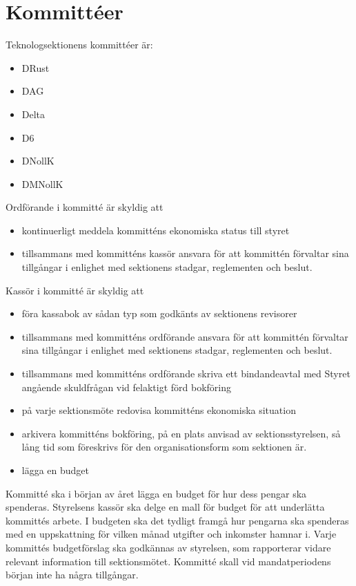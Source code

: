 \documentclass[a4paper]{dteklag}
\begin{document}
\section{Kommittéer}
\para Teknologsektionens kommittéer är:
\begin{itemize}
  \item DRust
  \item DAG
  \item Delta
  \item D6
  \item DNollK
  \item DMNollK
\end{itemize}
\para Ordförande i kommitté är skyldig att
\begin{itemize}
  \item kontinuerligt meddela kommitténs ekonomiska status till styret
  \item tillsammans med kommitténs kassör ansvara för att kommittén förvaltar sina tillgångar i enlighet med sektionens stadgar, reglementen och beslut.
\end{itemize}
\para Kassör i kommitté är skyldig att
\begin{itemize}
  \item föra kassabok av sådan typ som godkänts av sektionens revisorer
  \item tillsammans med kommitténs ordförande ansvara för att kommittén förvaltar sina tillgångar i enlighet med sektionens stadgar, reglementen och beslut.
  \item tillsammans med kommitténs ordförande skriva ett bindandeavtal med Styret angående skuldfrågan vid felaktigt förd bokföring
  \item på varje sektionsmöte redovisa kommitténs ekonomiska situation
  \item arkivera kommitténs bokföring, på en plats anvisad av sektionsstyrelsen, så lång tid som föreskrivs för den organisationsform som sektionen är.
  \item lägga en budget
\end{itemize}
\para Kommitté ska i början av året lägga en budget för hur dess pengar ska spenderas.
\stycke Styrelsens kassör ska delge en mall för budget för att underlätta kommittés arbete.
\stycke I budgeten ska det tydligt framgå hur pengarna ska spenderas med en uppskattning för vilken månad utgifter och inkomster hamnar i.
\para Varje kommittés budgetförslag ska godkännas av styrelsen, som rapporterar vidare relevant information till sektionsmötet.
\para Kommitté skall vid mandatperiodens början inte ha några tillgångar.
\end{document}
